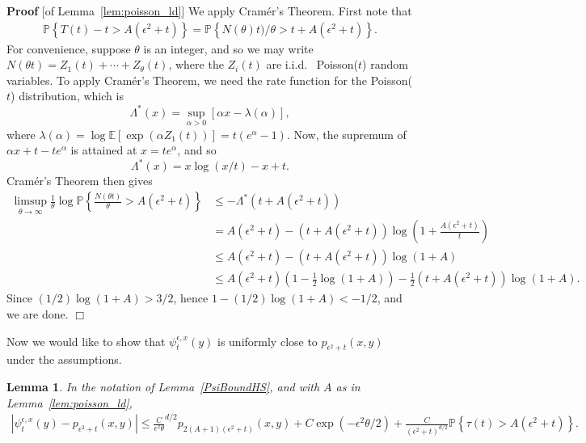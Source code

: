 \documentclass[12pt]{article}
\newenvironment {proof}{{\noindent\bf Proof }}{\hfill $\Box$ \medskip}
\newtheorem{lemma}[theorem]{Lemma}
\newcommand{\IP}{\mathbb P}
\newcommand{\IE}{\mathbb E}
\begin{document}
\begin{proof}[of Lemma~\ref{lem:poisson_ld}]
    We apply Cram\'er's Theorem.
    First note that
    \begin{align*}
        \IP\left\{
            T(t) - t > A(\epsilon^2 + t)
        \right\}
        =
        \IP\left\{
            N(\theta) t) / \theta
            >
            t + A(\epsilon^2 + t)
        \right\} .
    \end{align*}
    For convenience, suppose $\theta$ is an integer,
    and so we may write $N(\theta t) = Z_1(t) + \cdots + Z_\theta(t)$,
    where the $Z_i(t)$ are i.i.d.~ Poisson($t$) random variables.
    To apply Cram\'er's Theorem, we need the rate function for the Poisson($t$) distribution,
    which is
    \[
        \Lambda^*(x) = \sup_{\alpha > 0} \left[ \alpha x - \lambda(\alpha) \right],
    \]
    where $\lambda(\alpha) = \log \IE[\exp(\alpha Z_1(t))] = t(e^\alpha - 1)$.
    Now, the supremum of $\alpha x + t - te^\alpha$ is attained at $x = t e^\alpha$,
    and so
    \[
        \Lambda^*(x) = x \log(x/t) - x + t .
    \]
    Cram\'er's Theorem then gives
    \begin{align*}
        \limsup_{\theta \to \infty}
        \frac{1}{\theta} \log
        \IP\left\{
            \frac{N(\theta t)}{\theta}
            > A(\epsilon^2 + t)
        \right\}
    &\le
        - \Lambda^*(t + A(\epsilon^2 + t))
    \\ &=
        A(\epsilon^2 + t)
        -
        (t + A(\epsilon^2 + t)) \log\left( 1 + \frac{A(\epsilon^2 + t)}{t} \right) 
    \\ &\le
        A(\epsilon^2 + t)
        -
        (t + A(\epsilon^2 + t)) \log(1 + A)
    \\ &\le
        A(\epsilon^2 + t) \left( 1 - \frac{1}{2} \log(1 + A) \right)
        -
        \frac{1}{2} (t + A(\epsilon^2 + t)) \log(1 + A)  .
    \end{align*}
    Since $(1/2) \log(1 + A) > 3/2$, hence $1 - (1/2) \log(1 + A) < - 1/2$,
    and we are done.
\end{proof}

Now we would like to show that $\psi_t^{\epsilon,x}(y)$
is uniformly close to $p_{\epsilon^2 + t}(x, y)$
under the assumptions.

\begin{lemma}
    \label{lem:psi_approx_p}
    In the notation of Lemma~\ref{PsiBoundHS},
    and with $A$ as in Lemma~\ref{lem:poisson_ld},
    \begin{align*}
        \left|
            \psi_t^{\epsilon, x}(y)
            -
            p_{\epsilon^2 + t}(x, y)
        \right|
        \le
        \frac{C}{\epsilon^2 \theta}^{d/2}
        p_{2(A+1)(\epsilon^2+t)}(x, y)
        +
        C \exp(- \epsilon^2 \theta / 2)
        +
        \frac{C}{(\epsilon^2 + t)^{d/2}}
        \IP\left\{
            \tau(t) > A(\epsilon^2 + t)
        \right\} .
    \end{align*}
\end{lemma}
\end{document}
